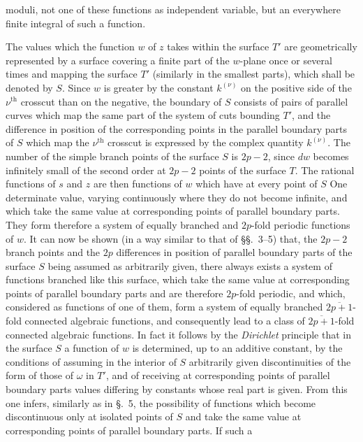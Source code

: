 \documentclass{article}
\begin{document}
moduli, not one of these functions as independent variable, but an everywhere finite integral of such a function.

The values which the function $w$ of $z$ takes within the surface $T'$ are geometrically represented by a surface covering a finite part of the $w$-plane once or several times and mapping the surface $T'$ (similarly in the smallest parts), which shall be denoted by $S$. Since $w$ is greater by the constant $k^{(\nu)}$ on the positive side of the $\nu^{\text{th}}$ crosscut than on the negative, the boundary of $S$ consists of pairs of parallel curves which map the same part of the system of cuts bounding $T'$, and the difference in position of the corresponding points in the parallel boundary parts of $S$ which map the $\nu^{\text{th}}$ crosscut is expressed by the complex quantity $k^{(\nu)}$. The number of the simple branch points of the surface $S$ is $2p-2$, since $dw$ becomes infinitely small of the second order at $2p-2$ points of the surface $T$. The rational functions of $s$ and $z$ are then functions of $w$ which have at every point of $S$ One determinate value, varying continuously where they do not become infinite, and which take the same value at corresponding points of parallel boundary parts. They form therefore a system of equally branched and $2p$-fold periodic functions of $w$. It can now be shown (in a way similar to that of §§.~3–5) that, the $2p-2$ branch points and the $2p$ differences in position of parallel boundary parts of the surface $S$ being assumed as arbitrarily given, there always exists a system of functions branched like this surface, which take the same value at corresponding points of parallel boundary parts and are therefore $2p$-fold periodic, and which, considered as functions of one of them, form a system of equally branched $\overline{2p+1}$-fold connected algebraic functions, and consequently lead to a class of $\overline{2p+1}$-fold connected algebraic functions. In fact it follows by the \emph{Dirichlet} principle that in the surface $S$ a function of $w$ is determined, up to an additive constant, by the conditions of assuming in the interior of $S$ arbitrarily given discontinuities of the form of those of $\omega$ in $T'$, and of receiving at corresponding points of parallel boundary parts values differing by constants whose real part is given. From this one infers, similarly as in §.~5, the possibility of functions which become discontinuous only at isolated points of $S$ and take the same value at corresponding points of parallel boundary parts. If such a
\end{document}
